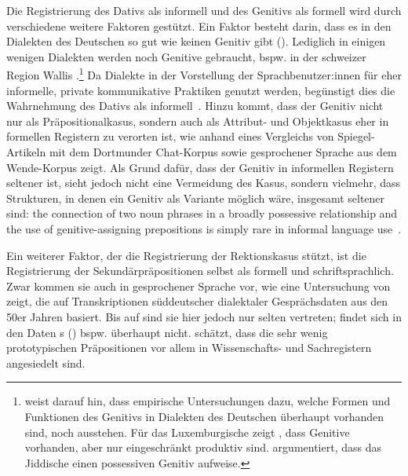 Die Registrierung des Dativs als informell und des Genitivs als formell wird durch verschiedene weitere Faktoren gestützt. 
Ein Faktor besteht darin, dass es in den Dialekten des Deutschen so gut wie keinen Genitiv gibt (\cites[s.][437]{Shrier.1965}[250]{Scott.2014}). Lediglich in einigen wenigen Dialekten werden noch Genitive gebraucht, bspw. in der schweizer Region Wallis \citep[s.][1243]{Ko.1983}.\footnote{\citet[339]{Scott.2014} weist darauf hin, dass empirische Untersuchungen dazu, welche Formen und Funktionen des Genitivs in Dialekten des Deutschen überhaupt vorhanden sind, noch ausstehen. Für das Luxemburgische zeigt \citet{Dohmer.2018}, dass Genitive vorhanden, aber nur eingeschränkt produktiv sind. \citet{Hoge.2018} argumentiert, dass das Jiddische einen possessiven Genitiv aufweise.} 
Da Dialekte in der Vorstellung der Sprachbenutzer:innen für eher informelle, private kommunikative Praktiken genutzt werden, begünstigt dies die Wahrnehmung des Dativs als informell~\citep[s.][221--222]{Maitz2015}. 
Hinzu kommt, dass der Genitiv nicht nur als Präpositionalkasus, sondern auch als Attribut- und Objektkasus eher in formellen Registern zu verorten ist, wie \citet[252]{Scott.2014} anhand eines Vergleichs von Spiegel-Artikeln mit dem Dortmunder Chat-Korpus sowie gesprochener Sprache aus dem Wende-Korpus zeigt. 
Als Grund daf{\"u}r, dass der Genitiv in informellen Registern seltener ist, sieht \citet[s.][276]{Scott.2014} jedoch nicht eine Vermeidung des Kasus, sondern vielmehr, dass Strukturen, in denen ein Genitiv als Variante m{\"o}glich w{\"a}re, insgesamt seltener sind: 
\glqq the connection of two noun phrases in a broadly possessive relationship and the use of genitive-assigning prepositions is simply rare in informal language use\grqq{}~\citep[276]{Scott.2014}.

Ein weiterer Faktor, der die Registrierung der Rektionskasus stützt, ist die Registrierung der Sekundärpräpositionen selbst als formell und schriftsprachlich. 
Zwar kommen sie auch in gesprochener Sprache vor, wie eine Untersuchung von \citet[]{Mikosch1987} zeigt, die auf Transkriptionen süddeutscher dialektaler Gesprächsdaten aus den 50er Jahren basiert. 
Bis auf \wegen{} sind sie hier jedoch nur selten vertreten; \dank{} findet sich in den Daten \citeauthor{Mikosch1987}s (\citeyear[125]{Mikosch1987}) bspw. überhaupt nicht.
\citet[48]{Bene.1975} sch{\"a}tzt, dass die sehr wenig prototypischen Pr{\"a}positionen vor allem in Wissenschafts- und Sachregistern angesiedelt sind. 

